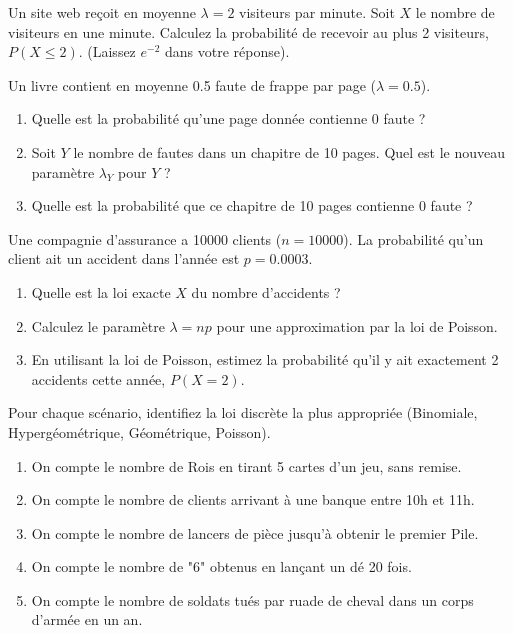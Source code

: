 \begin{exercicebox}
Un site web reçoit en moyenne $\lambda = 2$ visiteurs par minute. Soit $X$ le nombre de visiteurs en une minute.
Calculez la probabilité de recevoir au plus 2 visiteurs, $P(X \le 2)$. (Laissez $e^{-2}$ dans votre réponse).
\end{exercicebox}

\begin{exercicebox}
Un livre contient en moyenne 0.5 faute de frappe par page ($\lambda=0.5$).
\begin{enumerate}
    \item Quelle est la probabilité qu'une page donnée contienne 0 faute ?
    \item Soit $Y$ le nombre de fautes dans un chapitre de 10 pages. Quel est le nouveau paramètre $\lambda_Y$ pour $Y$ ?
    \item Quelle est la probabilité que ce chapitre de 10 pages contienne 0 faute ?
\end{enumerate}
\end{exercicebox}

\begin{exercicebox}
Une compagnie d'assurance a 10000 clients ($n=10000$). La probabilité qu'un client ait un accident dans l'année est $p=0.0003$.
\begin{enumerate}
    \item Quelle est la loi exacte $X$ du nombre d'accidents ?
    \item Calculez le paramètre $\lambda = np$ pour une approximation par la loi de Poisson.
    \item En utilisant la loi de Poisson, estimez la probabilité qu'il y ait exactement 2 accidents cette année, $P(X=2)$.
\end{enumerate}
\end{exercicebox}


\begin{exercicebox}
Pour chaque scénario, identifiez la loi discrète la plus appropriée (Binomiale, Hypergéométrique, Géométrique, Poisson).
\begin{enumerate}
    \item On compte le nombre de Rois en tirant 5 cartes d'un jeu, sans remise.
    \item On compte le nombre de clients arrivant à une banque entre 10h et 11h.
    \item On compte le nombre de lancers de pièce jusqu'à obtenir le premier Pile.
    \item On compte le nombre de "6" obtenus en lançant un dé 20 fois.
    \item On compte le nombre de soldats tués par ruade de cheval dans un corps d'armée en un an.
\end{enumerate}
\end{exercicebox}

